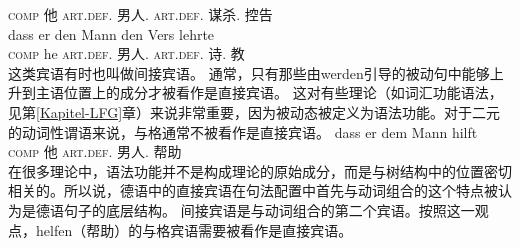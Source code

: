 	 \textsc{comp} 他 \textsc{art}.\textsc{def}.\acc{} 男人.\acc{} \textsc{art}.\textsc{def}.\gen{} 谋杀.\gen{} 控告\\
\ex 
\gll dass er den Mann den Vers lehrte\\
	 \textsc{comp} he \textsc{art}.\textsc{def}.\acc{} 男人.\acc{} \textsc{art}.\textsc{def}.\acc{} 诗.\acc{} 教\\
\zl
这类宾语有时也叫做间接宾语。
通常，只有那些由werden引导的被动句中能够上升到主语位置上的成分才被看作是直接宾语。
这对有些理论（如词汇功能语法，见第\ref{Kapitel-LFG}章）来说非常重要，因为被动态被定义为语法功能。对于二元的动词性谓语来说，与格通常不被看作是直接宾语\citep{Cook2006a-u}。
\ea
\gll dass er dem Mann hilft\\
     \textsc{comp} 他 \textsc{art}.\textsc{def}.\dat{} 男人.\dat{} 帮助\\
\z
在很多理论中，语法功能并不是构成理论的原始成分，而是与树结构中的位置密切相关的。所以说，德语中的直接宾语在句法配置中首先与动词组合的这个特点被认为是德语句子的底层结构。
间接宾语是与动词组合的第二个宾语。按照这一观点，helfen（帮助）的与格宾语需要被看作是直接宾语。

